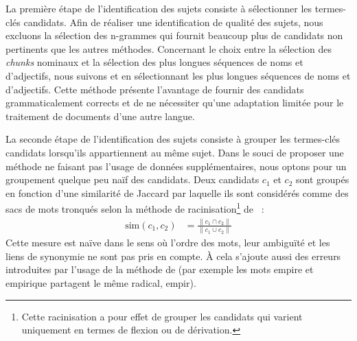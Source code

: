         La première étape de l'identification des sujets consiste à sélectionner
        les termes-clés candidats.
        Afin de réaliser une identification de qualité des sujets, nous excluons
        la sélection des n-grammes qui fournit beaucoup plus de candidats non
        pertinents que les autres méthodes. Concernant le choix entre la
        sélection des \textit{chunks} nominaux et la sélection des plus longues
        séquences de noms et d'adjectifs, nous suivons
         et  en
        sélectionnant les plus longues séquences de noms et d'adjectifs. Cette
        méthode présente l'avantage de fournir des candidats grammaticalement
        corrects et de ne nécessiter qu'une adaptation limitée pour le
        traitement de documents d'une autre langue.

        La seconde étape de l'identification des sujets consiste à grouper les
        termes-clés candidats lorsqu'ils appartiennent au même sujet. Dans le
        souci de proposer une méthode ne faisant pas l'usage de données
        supplémentaires, nous optons pour un groupement quelque peu naïf des
        candidats. Deux candidats $c_1$ et $c_2$ sont groupés en fonction d'une
        similarité de Jaccard par laquelle ils sont considérés comme des sacs de
        mots tronqués selon la méthode de racinisation\footnote{Cette
        racinisation a pour effet de grouper les candidats qui varient
        uniquement en termes de flexion ou de dérivation.} de
        ~:
        \begin{align}
          \text{sim}(c_1, c_2) &= \frac{\|c_1 \cap c_2\|}{\|c_1 \cup c_2\|} \label{equa:jaccard}
        \end{align}
        Cette mesure est naïve dans le sens où l'ordre des mots, leur ambiguïté
        et les liens de synonymie ne sont pas pris en compte. À cela s'ajoute
        aussi des erreurs introduites par l'usage de la méthode de
         (par exemple les mots
        \og{}empire\fg{} et \og{}empirique\fg{} partagent le même radical,
        \og{}empir\fg{}).

